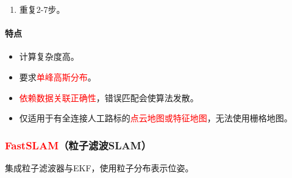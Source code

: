 \documentclass[
12pt, %
a4paper, 
oneside, %
]{scrartcl}
\begin{document}
\begin{enumerate}
得到新的状态（\textcolor{red}{扩充内容}）：
\begin{align*}
X_t = \begin{bmatrix} X_R \\ M_1 \\ M_2 \\ \vdots \\ M_n \\ \color{red} M_{n + 1} \end{bmatrix}, \quad
\Sigma_t = \begin{bmatrix} 
\Sigma_{X_R} & \Sigma_{X_R m_1} & \cdots & \Sigma_{X_R m_n} & \color{red}\Sigma_{X_R m_{n + 1}} \\
\Sigma_{m_1 X_R} & \Sigma_{m_1} & \cdots & \Sigma_{m_1 m_n} & \color{red}\Sigma_{m_1 m_{n + 1}} \\
\Sigma_{m_2 X_R} & \Sigma_{m_2 m_1} & \cdots & \Sigma_{m_2 m_n} & \color{red}\Sigma_{m_2 m_{n + 1}} \\
\vdots & \vdots & \ddots & \vdots & \color{red}\vdots \\
\Sigma_{m_n X_R} & \Sigma_{m_n m_1} & \cdots & \Sigma_{m_n} & \color{red}\Sigma_{m_n m_{n + 1}} \\
\color{red}\Sigma_{m_{n + 1} X_R} & \color{red}\Sigma_{m_{n + 1} m_1} & \color{red}\cdots & \color{red}\Sigma_{m_{n + 1} m_n} & \color{red}\Sigma_{m_{n + 1}}
\end{bmatrix}
\end{align*}
\item 重复2-7步。
\end{enumerate}
\paragraph{特点}
\begin{itemize}
\item 计算复杂度高。
\item 要求\textcolor{red}{单峰高斯分布}。
\item \textcolor{red}{依赖数据关联正确性}，错误匹配会使算法发散。
\item 仅适用于有全连接人工路标的\textcolor{red}{点云地图或特征地图}，无法使用栅格地图。
\end{itemize}
\subsubsection[FastSLAM]{\textcolor{red}{FastSLAM}（粒子滤波SLAM）}
集成粒子滤波器与EKF，使用粒子分布表示位姿。
\end{document}
